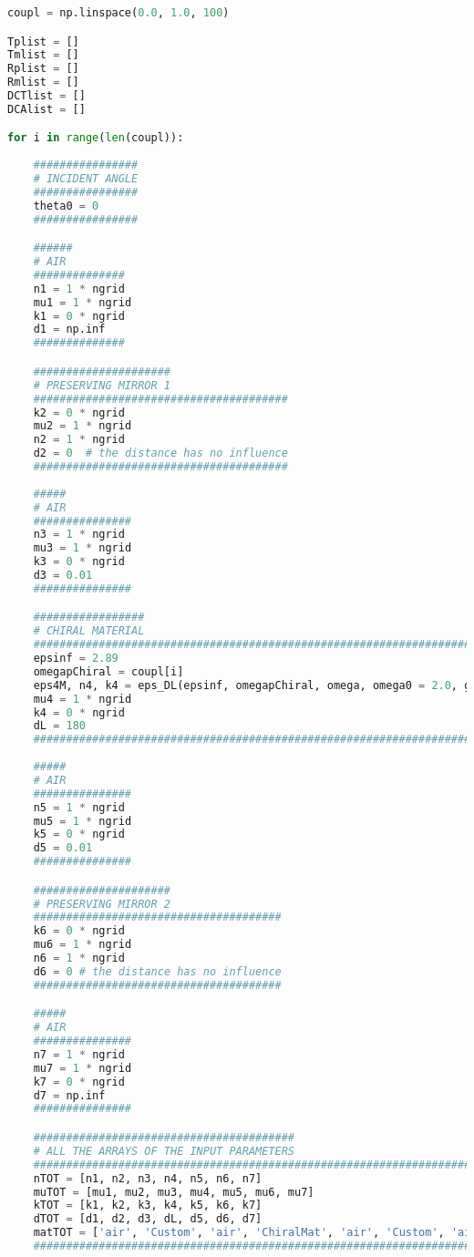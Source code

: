 \documentclass[showpacs,aps,prl,onecolumn,superscriptaddress]{revtex4-1}
\begin{document}
\begin{lstlisting}[language=Python, label=multPres, caption=Layers of a preserving FP.]
coupl = np.linspace(0.0, 1.0, 100)

Tplist = []
Tmlist = []
Rplist = []
Rmlist = []
DCTlist = []
DCAlist = []

for i in range(len(coupl)):
    
    ################
    # INCIDENT ANGLE
    ################
    theta0 = 0
    ################

    ######
    # AIR
    ##############
    n1 = 1 * ngrid
    mu1 = 1 * ngrid
    k1 = 0 * ngrid
    d1 = np.inf
    ##############

    #####################
    # PRESERVING MIRROR 1
    #######################################
    k2 = 0 * ngrid
    mu2 = 1 * ngrid
    n2 = 1 * ngrid
    d2 = 0  # the distance has no influence
    #######################################
    
    #####
    # AIR 
    ###############
    n3 = 1 * ngrid
    mu3 = 1 * ngrid
    k3 = 0 * ngrid
    d3 = 0.01
    ###############

    #################
    # CHIRAL MATERIAL
    #########################################################################################
    epsinf = 2.89
    omegapChiral = coupl[i]
    eps4M, n4, k4 = eps_DL(epsinf, omegapChiral, omega, omega0 = 2.0, gamma = 0.05, k0 = 0.0)
    mu4 = 1 * ngrid
    k4 = 0 * ngrid
    dL = 180
    ######################################################################################### 
       
    #####
    # AIR 
    ###############
    n5 = 1 * ngrid
    mu5 = 1 * ngrid
    k5 = 0 * ngrid
    d5 = 0.01
    ###############

    #####################
    # PRESERVING MIRROR 2
    ######################################
    k6 = 0 * ngrid
    mu6 = 1 * ngrid
    n6 = 1 * ngrid
    d6 = 0 # the distance has no influence
    ######################################  

    #####
    # AIR
    ###############
    n7 = 1 * ngrid
    mu7 = 1 * ngrid
    k7 = 0 * ngrid
    d7 = np.inf
    ###############

    ########################################
    # ALL THE ARRAYS OF THE INPUT PARAMETERS
    #############################################################################
    nTOT = [n1, n2, n3, n4, n5, n6, n7]
    muTOT = [mu1, mu2, mu3, mu4, mu5, mu6, mu7]
    kTOT = [k1, k2, k3, k4, k5, k6, k7] 
    dTOT = [d1, d2, d3, dL, d5, d6, d7] 
    matTOT = ['air', 'Custom', 'air', 'ChiralMat', 'air', 'Custom', 'air']
    #############################################################################


\end{lstlisting}
\end{document}
